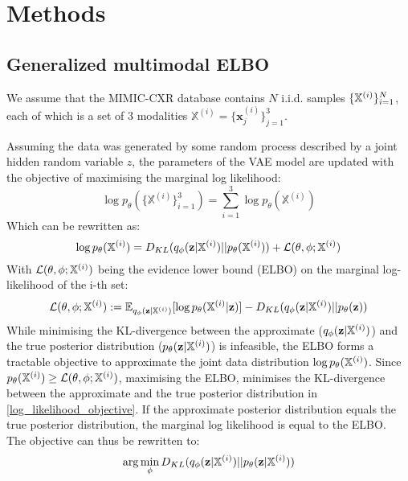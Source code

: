\section{Methods}

\subsection{Generalized multimodal ELBO}

We assume that the MIMIC-CXR database contains $N$ i.i.d. samples $\{\mathbb{X}^{(i)}\}^N_{i=1}$, each of which is a set of 3 modalities $\mathbb{X}^{(i)} = \{\textbf{x}_j^{(i)}\}^3_{j=1}$.

Assuming the data was generated by some random process described by a joint hidden random variable $z$, the parameters of the VAE model are updated with the objective of maximising the marginal log likelihood:
\begin{equation}
    \log p_{\theta}(\{\mathbb{X}^{(i)}\}_{i=1}^3) = \sum _{i=1}^3 \log p_{\theta}(\mathbb{X}^{(i)})
\end{equation}
Which can be rewritten as:
\begin{equation}
    \label{log_likelihood_objective}
    \log p_{\theta}(\mathbb{X}^{(i)}) = D_{KL}(q_{\phi}(\textbf{z}|\mathbb{X}^{(i)})||p_{\theta}(\mathbb{X}^{(i)})) + \mathcal{L}(\theta, \phi; \mathbb{X}^{(i)})
\end{equation}
With $\mathcal{L}(\theta, \phi; \mathbb{X}^{(i)})$ being the evidence lower bound (ELBO) on the marginal log-likelihood of the i-th set:
\begin{equation}
    \mathcal{L}(\theta, \phi; \mathbb{X}^{(i)}) := \mathbb{E}_{q_{\phi}(\textbf{z}|\mathbb{X}^{(i)})}[\log p_{\theta}(\mathbb{X}^{(i)}|\textbf{z})] - D_{KL}(q_{\phi}(\textbf{z}|\mathbb{X}^{(i)})||p_{\theta}(\textbf{z}))
\end{equation}
While minimising the KL-divergence between the approximate ($q_{\phi}(\textbf{z}|\mathbb{X}^{(i)})$) and the true posterior distribution ($p_{\theta}(\textbf{z}|\mathbb{X}^{(i)})$) is infeasible, the ELBO forms a tractable objective to approximate the joint data distribution $\log p_{\theta}(\mathbb{X}^{(i)})$.
Since $p_{\theta}(\mathbb{X}^{(i)}) \geq \mathcal{L}(\theta, \phi; \mathbb{X}^{(i)})$, maximising the ELBO, minimises the KL-divergence between the approximate and the true posterior distribution in \cref{log_likelihood_objective}.
If the approximate posterior distribution equals the true posterior distribution, the marginal log likelihood is equal to the ELBO.\\
The objective can thus be rewritten to:
\begin{equation}
    \arg \min _{\phi} D_{KL}(q_{\phi}(\textbf{z}|\mathbb{X}^{(i)})||p_{\theta}(\textbf{z}|\mathbb{X}^{(i)}))
\end{equation}

